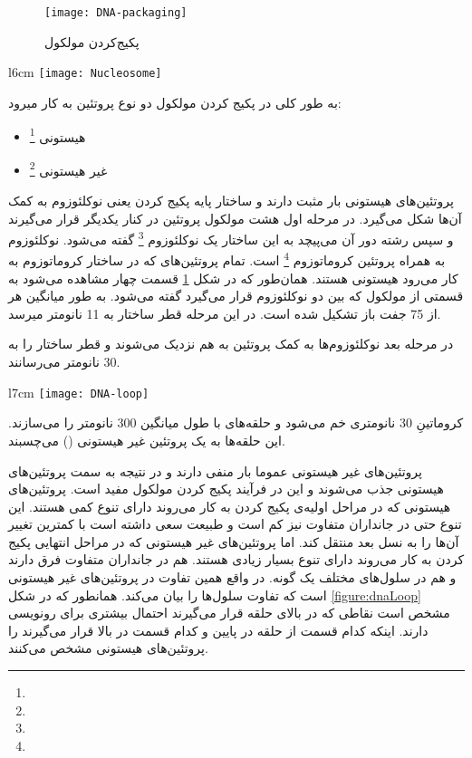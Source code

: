 \begin{figure}[htbp]
	\centering
	\texttt{[image: DNA-packaging]}
	\caption{پکیج‌کردن مولکول 
	}
	\label{figure:dnaPackaging}
\end{figure}

\begin{wrapfigure}[12]{l}{6cm}
	\centering
	\texttt{[image: Nucleosome]}
	\caption{ساختار نوکلئوزوم. از هر کدام از پروتئین‌های نامبرده دو تا کنار هم قرار دارند. 
	جزء نوکلئوزوم نیست.}
	\label{figure:nucleosome}
\end{wrapfigure}


به طور کلی در پکیج کردن مولکول
دو نوع پروتئین به کار میرود:
\begin{itemize}
\item هیستونی
\footnote{}
\item غیر هیستونی
\footnote{}
\end{itemize}
پروتئین‌های هیستونی بار مثبت دارند و ساختار پایه پکیج کردن یعنی نوکلئوزوم به کمک آن‌ها شکل می‌گیرد.
در مرحله اول هشت مولکول پروتئین در کنار یکدیگر قرار می‌گیرند و سپس رشته
دور آن می‌پیچد به این ساختار یک نوکلئوزوم
\footnote{}
گفته می‌شود. نوکلئوزوم به همراه پروتئین
کروماتوزوم
\footnote{} 
است. تمام پروتئین‌های که در ساختار کروماتوزوم به کار می‌رود هیستونی هستند. همان‌طور که در شکل
\ref{figure:dnaPackaging}
قسمت چهار مشاهده می‌شود به قسمتی از مولکول
که بین دو نوکلئوزوم قرار می‌گیرد
گفته می‌شود.
به طور میانگین هر
از 75 جفت باز تشکیل شده است.
در این مرحله قطر ساختار به 11 نانومتر میرسد. 

در مرحله بعد نوکلئوزوم‌ها به کمک پروتئین
به هم نزدیک می‌شوند و قطر ساختار را به 30 نانومتر می‌رسانند.

\begin{wrapfigure}[14]{l}{7cm}
	\centering
	\texttt{[image: DNA-loop]}
	\caption{حلقه‌های مولکول 
	به طول متوسط 300 نانومتر}
	\label{figure:dnaLoop}
\end{wrapfigure}

کروماتینِ 30 نانومتری خم می‌شود و حلقه‌های با طول میانگین 300 نانومتر را می‌سازند. این حلقه‌ها به یک پروتئین غیر هیستونی
()
می‌چسبند.

پروتئین‌های غیر هیستونی عموما بار منفی دارند و در نتیجه به سمت پروتئین‌های هیستونی جذب می‌شوند و این در فرآیند پکیج کردن مولکول
مفید است.
پروتئین‌های هیستونی که در مراحل اولیه‌ی پکیج کردن به کار می‌روند دارای تنوع کمی هستند. این تنوع حتی در جانداران متفاوت نیز کم است و طبیعت سعی داشته است با کمترین تغییر‌ آن‌ها را به نسل بعد منتقل کند. اما پروتئین‌های غیر هیستونی که در مراحل انتهایی پکیج کردن به کار می‌روند دارای تنوع بسیار زیادی هستند. هم در جانداران متفاوت فرق دارند و هم در سلول‌های مختلف یک گونه. در واقع همین تفاوت در پروتئین‌های غیر هیستونی است که تفاوت سلول‌ها را بیان می‌کند. همانطور که در شکل
\ref{figure:dnaLoop}
مشخص است نقاطی که در بالای حلقه قرار می‌گیرند احتمال بیشتری برای رونویسی دارند. اینکه کدام قسمت از حلقه در پایین و کدام قسمت در بالا قرار می‌گیرند را پروتئین‌های هیستونی مشخص می‌کنند.

